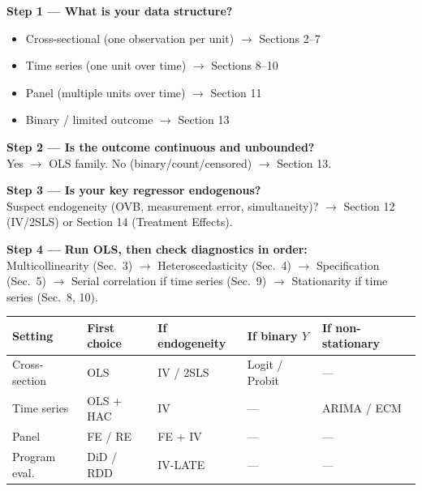 \documentclass[10pt,a4paper]{article}
\begin{document}
\begin{tcolorbox}[colback=LightBlue,colframe=NavyBlue,arc=3pt,boxrule=0.8pt]
\small
\textbf{Step 1 — What is your data structure?}
\begin{itemize}
  \item Cross-sectional (one observation per unit) $\to$ Sections 2–7
  \item Time series (one unit over time) $\to$ Sections 8–10
  \item Panel (multiple units over time) $\to$ Section 11
  \item Binary / limited outcome $\to$ Section 13
\end{itemize}

\textbf{Step 2 — Is the outcome continuous and unbounded?}\\
Yes $\to$ OLS family. \quad No (binary/count/censored) $\to$ Section 13.

\textbf{Step 3 — Is your key regressor endogenous?}\\
Suspect endogeneity (OVB, measurement error, simultaneity)?  $\to$ Section 12 (IV/2SLS) or Section 14 (Treatment Effects).

\textbf{Step 4 — Run OLS, then check diagnostics in order:}\\
Multicollinearity (Sec.~3) $\to$ Heteroscedasticity (Sec.~4) $\to$
Specification (Sec.~5) $\to$ Serial correlation if time series (Sec.~9) $\to$
Stationarity if time series (Sec.~8, 10).
\end{tcolorbox}

\bigskip

\begin{center}
\footnotesize
\begin{tabular}{lllll}
\toprule
\rowcolor{NavyBlue}\color{white}\textbf{Setting} &
\color{white}\textbf{First choice} &
\color{white}\textbf{If endogeneity} &
\color{white}\textbf{If binary $Y$} &
\color{white}\textbf{If non-stationary} \\
\midrule
Cross-section & OLS & IV / 2SLS & Logit / Probit & --- \\
\rowcolor{RowGray}
Time series & OLS + HAC & IV & --- & ARIMA / ECM \\
Panel & FE / RE & FE + IV & --- & --- \\
\rowcolor{RowGray}
Program eval. & DiD / RDD & IV-LATE & --- & --- \\
\bottomrule
\end{tabular}
\end{center}

\newpage
\end{document}

